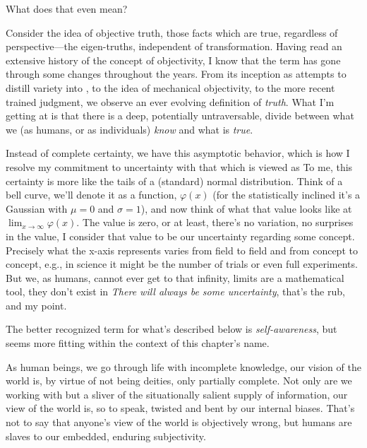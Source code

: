 \documentclass[../butidigress.tex]{subfiles}
\begin{document}
What does that even mean?

Consider the idea of objective truth, those facts which are true, regardless of perspective---the eigen-truths, independent of transformation.
Having read an extensive history of the concept of objectivity, I know that the term has gone through some changes throughout the years\autocite{objectivity}.
From its inception as attempts to distill variety into , to the idea of mechanical objectivity, to the more recent trained judgment, we observe an ever evolving definition of \emph{truth}.
What I'm getting at is that there is a deep, potentially untraversable, divide between what we (as humans, or as individuals) \emph{know} and what is \emph{true}.

Instead of complete certainty, we have this asymptotic behavior, which is how I resolve my commitment to uncertainty with that which is viewed as 
To me, this certainty is more like the tails of a (standard) normal distribution.
Think of a bell curve, we'll denote it as a function, $\varphi(x)$ (for the statistically inclined it's a Gaussian with $\mu = 0$ and $\sigma = 1$), and now think of what that value looks like at $\lim_{x\to\infty}\varphi(x)$.
The value is zero, or at least, there's no variation, no surprises in the value, I consider that value to be our uncertainty regarding some concept.
Precisely what the x-axis represents varies from field to field and from concept to concept, e.g., in science it might be the number of trials or even full experiments.
But we, as humans, cannot ever get to that infinity, limits are a mathematical tool, they don't exist in 
\emph{There will always be some uncertainty}, that's the rub, and my point.

The better recognized term for what's described below is \emph{self-awareness}, but  seems more fitting within the context of this chapter's name.

As human beings, we go through life with incomplete knowledge, our vision of the world is, by virtue of not being deities, only partially complete.
Not only are we working with but a sliver of the situationally salient supply of information, our view of the world is,  so to speak, twisted and bent by our internal biases.
That's not to say that anyone's view of the world is objectively wrong, but humans are slaves to our embedded, enduring subjectivity.
\end{document}
